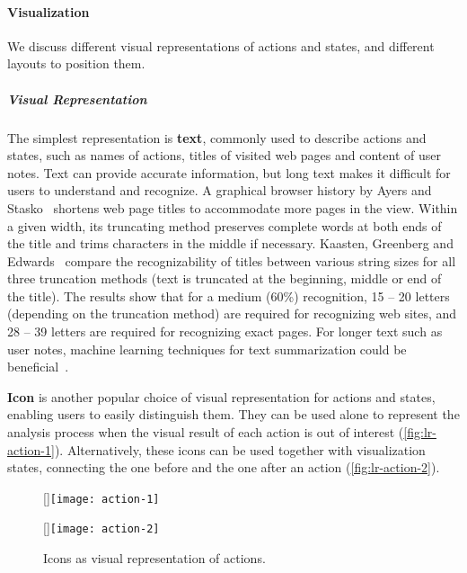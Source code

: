 \paragraph{Visualization}
We discuss different visual representations of actions and states, and different layouts to position them.

\subparagraph{Visual Representation}
The simplest representation is \textbf{text}, commonly used to describe actions and states, such as names of actions, titles of visited web pages and content of user notes. Text can provide accurate information, but long text makes it difficult for users to understand and recognize. A graphical browser history by Ayers and Stasko~\cite{Ayers1995} shortens web page titles to accommodate more pages in the view. Within a given width, its truncating method preserves complete words at both ends of the title and trims characters in the middle if necessary. Kaasten, Greenberg and Edwards~\cite{Kaasten2001} compare the recognizability of titles between various string sizes for all three truncation methods (text is truncated at the beginning, middle or end of the title). The results show that for a medium (60\%) recognition, 15 -- 20 letters (depending on
the truncation method) are required for recognizing web sites, and 28 -- 39 letters are required for recognizing exact pages. For longer text such as user notes, machine learning techniques for text summarization could be beneficial~\cite{Nenkova2012}.

\textbf{Icon} is another popular choice of visual representation for actions and states, enabling users to easily distinguish them. They can be used alone to represent the analysis process when the visual result of each action is out of interest (\autoref{fig:lr-action-1}). Alternatively, these icons can be used together with visualization states, connecting the one before and the one after an action (\autoref{fig:lr-action-2}).

\begin{figure}
\centering
{}[\columnwidth]{\texttt{[image: action-1]}}

\vspace{.5\baselineskip}

[\columnwidth]{\texttt{[image: action-2]}}
\caption{Icons as visual representation of actions.}
\end{figure}

